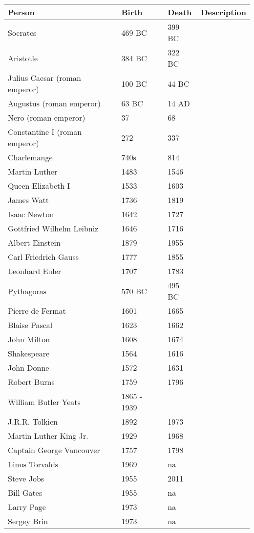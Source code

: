 \documentclass{article}
\begin{document}
\begin{table}[H]
	\centering
	\begin{tabularx}{\textwidth}{ X X X X }
		Person & Birth & Death & Description \\
		\hline
		Socrates & 469 BC & 399 BC & \\
		Aristotle & 384 BC & 322 BC & \\
		Julius Caesar (roman emperor) & 100 BC & 44 BC \\
		Augustus (roman emperor) & 63 BC & 14 AD \\
		Nero (roman emperor) & 37 & 68 \\
		Constantine I (roman emperor) & 272 & 337 \\
		Charlemange & 740s & 814 \\
		Martin Luther & 1483 & 1546 \\
		Queen Elizabeth I & 1533 & 1603 \\
		James Watt & 1736 & 1819 \\
		Isaac Newton & 1642 & 1727 & \\
		Gottfried Wilhelm Leibniz & 1646 & 1716 & \\
		Albert Einstein & 1879 & 1955 & \\
		Carl Friedrich Gauss & 1777 & 1855 & \\
		Leonhard Euler & 1707 & 1783 & \\
		Pythagoras & 570 BC & 495 BC & \\
		Pierre de Fermat & 1601 & 1665 & \\
		Blaise Pascal & 1623 & 1662 & \\
		John Milton & 1608 & 1674 & \\
		Shakespeare & 1564 & 1616 & \\
		John Donne & 1572 & 1631 & \\
		Robert Burns & 1759 & 1796 & \\
		William Butler Yeats & 1865 - 1939 & \\
		J.R.R. Tolkien & 1892 & 1973 & \\
		Martin Luther King Jr. & 1929 & 1968 & \\
		Captain George Vancouver & 1757 & 1798 & \\
		Linus Torvalds & 1969 & na & \\
		Steve Jobs & 1955 & 2011 & \\
		Bill Gates & 1955 & na & \\
		Larry Page & 1973 & na & \\
		Sergey Brin & 1973 & na & \\

\end{tabularx}
\end{table}
\end{document}
